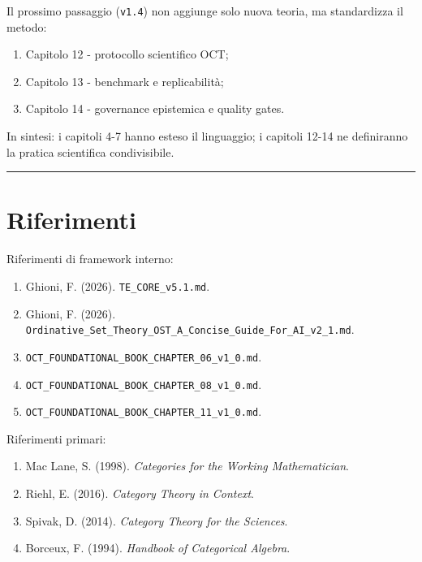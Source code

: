 Il prossimo passaggio (\texttt{v1.4}) non aggiunge solo nuova teoria, ma standardizza il metodo:

\begin{enumerate}
\def\labelenumi{\arabic{enumi}.}
\tightlist
\item
  Capitolo 12 - protocollo scientifico OCT;
\item
  Capitolo 13 - benchmark e replicabilità;
\item
  Capitolo 14 - governance epistemica e quality gates.
\end{enumerate}

In sintesi: i capitoli 4-7 hanno esteso il linguaggio; i capitoli 12-14 ne definiranno la pratica scientifica condivisibile.

\begin{center}\rule{0.5\linewidth}{0.5pt}\end{center}

\section{Riferimenti}

Riferimenti di framework interno:

\begin{enumerate}
\def\labelenumi{\arabic{enumi}.}
\tightlist
\item
  Ghioni, F. (2026). \texttt{TE\_CORE\_v5.1.md}.
\item
  Ghioni, F. (2026). \texttt{Ordinative\_Set\_Theory\_OST\_A\_Concise\_Guide\_For\_AI\_v2\_1.md}.
\item
  \texttt{OCT\_FOUNDATIONAL\_BOOK\_CHAPTER\_06\_v1\_0.md}.
\item
  \texttt{OCT\_FOUNDATIONAL\_BOOK\_CHAPTER\_08\_v1\_0.md}.
\item
  \texttt{OCT\_FOUNDATIONAL\_BOOK\_CHAPTER\_11\_v1\_0.md}.
\end{enumerate}

Riferimenti primari:

\begin{enumerate}
\def\labelenumi{\arabic{enumi}.}
\tightlist
\item
  Mac Lane, S. (1998). \emph{Categories for the Working Mathematician}.
\item
  Riehl, E. (2016). \emph{Category Theory in Context}.
\item
  Spivak, D. (2014). \emph{Category Theory for the Sciences}.
\item
  Borceux, F. (1994). \emph{Handbook of Categorical Algebra}.
\end{enumerate}
